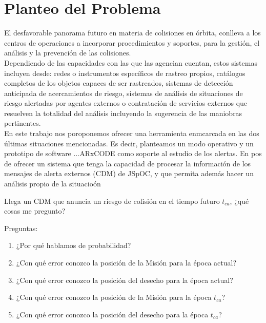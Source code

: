 \section{Planteo del Problema}

El desfavorable panorama futuro en materia de colisiones en \'orbita, conlleva a los centros de operaciones a incorporar procedimientos y soportes, para la gesti\'on, el an\'alisis y la prevenci\'on de las colisiones.\\
Dependiendo de las capacidades con las que las agencian cuentan, estos sistemas incluyen desde: redes o instrumentos espec\'ificos de rastreo propios, cat\'alogos completos de los objetos capaces de ser rastreados, sistemas de detecci\'on anticipada de acercamientos de riesgo, sistemas de an\'alisis de situaciones de riesgo alertadas por agentes externos o contrataci\'on de servicios externos que resuelven la totalidad del an\'alisis incluyendo la sugerencia de las maniobras pertinentes.\\

En este trabajo nos poroponemos ofrecer una herramienta enmcarcada en las dos \'ultimas situaciones mencionadas. Es decir, planteamos un modo operativo y un prototipo de software ...ARxCODE como soporte al estudio de los alertas. 
En pos de ofrecer un sistema que tenga la capacidad de procesar la informaci\'on de los mensajes de alerta externos (CDM) de JSpOC, y 
que permita adem\'as hacer un an\'alisis propio de la situacio\'on  

Llega un CDM que anuncia un riesgo de colisi\'on en el tiempo futuro $t_{ca}$, ¿qu\'e cosas me pregunto?

Preguntas:\\

\begin{enumerate}
 \item ¿Por qu\'e hablamos de probabilidad?
 \item ¿Con qu\'e error conozco la posici\'on de la Misi\'on para la \'epoca actual?\\
 \item ¿Con qu\'e error conozco la posici\'on del desecho para la \'epoca actual?\\
 \item ¿Con qu\'e error conozco la posici\'on de la Misi\'on para la \'epoca $t_{ca}$?\\
 \item ¿Con qu\'e error conozco la posici\'on del desecho para la \'epoca $t_{ca}$?\\
\end{enumerate}

